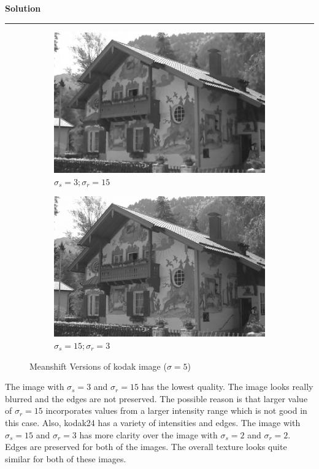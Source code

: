 \documentclass[a4paper]{article}
\newenvironment{solution}[2][]{%
    \begin{mdframed}[linecolor=green!60!black, linewidth=2pt, roundcorner=10pt, backgroundcolor=green!5!white, skipabove=12pt, skipbelow=12pt]%
        \textbf{\large #2} %
        \par\noindent\rule{\textwidth}{0.4pt} %
        \vspace{0.5em} %
}{%
    \end{mdframed}%
}
\begin{document}
\begin{solution}{Solution}
\begin{figure}[H]
\begin{subfigure}[b]{0.24\textwidth}
        \includegraphics[width=\textwidth]{../images/filtered_kodak24_meanshift_sigma_5_sigma_s_3_sigma_r_15.png}
        \caption{$\sigma_s=3;\sigma_r=15$}
        \label{fig:subfig3}
    \end{subfigure}
    \begin{subfigure}[b]{0.24\textwidth}
        \centering
        \includegraphics[width=\textwidth]{../images/filtered_kodak24_meanshift_sigma_5_sigma_s_15_sigma_r_3.png}
        \caption{$\sigma_s=15;\sigma_r=3$}
        \label{fig:subfig3}
    \end{subfigure}
    
    \caption{Meanshift Versions of kodak image ($\sigma=5$)}
    \label{fig:overall}
\end{figure}


The image with $\sigma_s=3$ and $\sigma_r=15$ has the lowest quality. The image looks really blurred and the edges are not preserved. The possible reason is that larger value of $\sigma_r=15$ incorporates values from a larger intensity range which is not good in this case.  Also, kodak24 has a variety of intensities and edges. The image with $\sigma_s=15$ and $\sigma_r=3$ has more clarity over the image with $\sigma_s=2$ and $\sigma_r=2$. Edges are preserved for both of the images. The overall texture looks quite similar for both of these images.



\end{solution}
\end{document}
